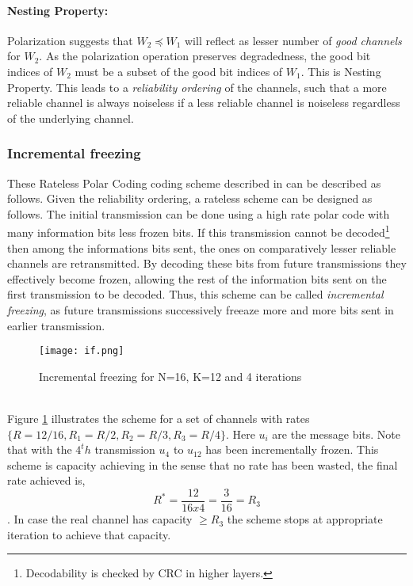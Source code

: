 \documentclass[
11pt, %
a4paper, %
oneside, %
headinclude,footinclude, %
BCOR5mm, %
]{scrartcl}
\begin{document}
\paragraph{Nesting Property:}Polarization suggests that $W_2 \preceq W_1$ will reflect as lesser number of \emph{good channels} for $W_2$. As the polarization operation preserves degradedness, the good bit indices of $W_2$ must be a subset of the good bit indices of $W_1$. This is Nesting Property. This leads to a \emph{reliability ordering} of the channels, such that a more reliable channel is always noiseless if a less reliable channel is noiseless regardless of the underlying channel.
\subsubsection{Incremental freezing}\label{if}
These Rateless Polar Coding coding scheme described in \cite{chen} can be described as follows.
Given the reliability ordering, a rateless scheme can be designed as follows. The initial transmission can be done using a high rate polar code with many information bits less frozen bits. If this transmission cannot be decoded\footnote{Decodability is checked by CRC in higher layers.} then among the informations bits sent, the ones on comparatively lesser reliable channels are retransmitted. By decoding these bits from future transmissions they effectively become frozen, allowing the rest of the information bits sent on the first transmission to be decoded. Thus, this scheme can be called \emph{incremental freezing}, as future transmissions successively freeaze more and more bits sent in earlier transmission.
\begin{figure}[h]
 \begin{center}
    \texttt{[image: if.png]}
  \end{center}
  \caption{Incremental freezing for N=16, K=12 and 4 iterations}
  \label{fig:if}
\end{figure}  
\\Figure \ref{fig:if} illustrates the scheme for a set of channels with rates $\{ R=12/16, R_1= R/2,R_2= R/3,R_3= R/4\}$. Here $u_i$ are the message bits. Note that with the $4^th$ transmission  $u_4$ to $u_{12}$ has been incrementally frozen. This scheme is capacity achieving in the sense that no rate has been wasted, the final rate achieved is, $$R^*= \frac{12}{16x4}=\frac{3}{16}=R_3 $$. In case the real channel has capacity $ \geq R_3$ the scheme stops at appropriate iteration to achieve that capacity.\\
\end{document}
